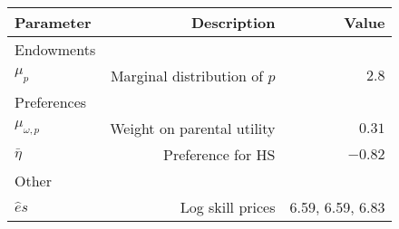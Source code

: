 \begin{tabular}{lrr}
\hline
Parameter & Description  & Value  \\ 
\hline
Endowments &   &   \\ 
$\mu_{p}$ & Marginal distribution of $p$  & $2.8$  \\ 
Preferences &   &   \\ 
$\mu_{\omega,p}$ & Weight on parental utility  & $0.31$  \\ 
$\bar{\eta}$ & Preference for HS  & $-0.82$  \\ 
Other &   &   \\ 
$\hat{e}{s}$ & Log skill prices  & 6.59, 6.59, 6.83  \\ 
\hline
\end{tabular}%
